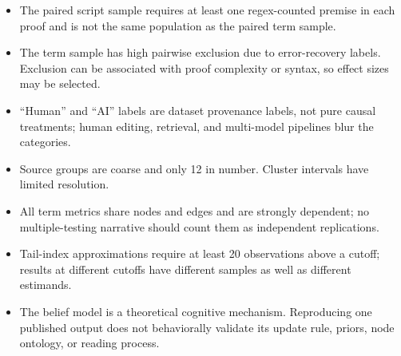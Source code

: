 \documentclass[11pt]{article}
\begin{document}
\begin{itemize}[leftmargin=*]
  \item The paired script sample requires at least one regex-counted premise in each proof and is
        not the same population as the paired term sample.
  \item The term sample has high pairwise exclusion due to error-recovery labels.  Exclusion can be
        associated with proof complexity or syntax, so effect sizes may be selected.
  \item ``Human'' and ``AI'' labels are dataset provenance labels, not pure causal treatments;
        human editing, retrieval, and multi-model pipelines blur the categories.
  \item Source groups are coarse and only 12 in number.  Cluster intervals have limited resolution.
  \item All term metrics share nodes and edges and are strongly dependent; no multiple-testing
        narrative should count them as independent replications.
  \item Tail-index approximations require at least 20 observations above a cutoff; results at
        different cutoffs have different samples as well as different estimands.
  \item The belief model is a theoretical cognitive mechanism.  Reproducing one published output
        does not behaviorally validate its update rule, priors, node ontology, or reading process.
\end{itemize}



\end{document}
